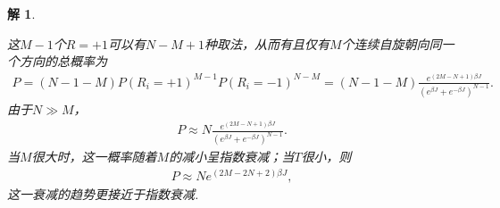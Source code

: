 \documentclass[UTF8,10pt,a4paper]{article}
\theoremstyle{Problem}
\theoremstyle{Solution}
\newtheorem*{sol}{解}
\begin{document}
\begin{sol}
\begin{enumerate}
        这$M-1$个$R=+1$可以有$N-M+1$种取法，从而有且仅有$M$个连续自旋朝向同一个方向的总概率为
        \begin{align}
            P=(N-1-M)P(R_i=+1)^{M-1}P(R_i=-1)^{N-M}=(N-1-M)\frac{e^{(2M-N+1)\beta J}}{(e^{\beta J}+e^{-\beta J})^{N-1}}.
        \end{align}
        由于$N\gg M$，
        \begin{align}
            P\approx N\frac{e^{(2M-N+1)\beta J}}{(e^{\beta J}+e^{-\beta J})^{N-1}}.
        \end{align}
        当$M$很大时，这一概率随着$M$的减小呈指数衰减；当$T$很小，则
        \begin{align}
            P\approx Ne^{(2M-2N+2)\beta J},
        \end{align}
        这一衰减的趋势更接近于指数衰减.
    \end{enumerate}
\end{sol}
\end{document}
